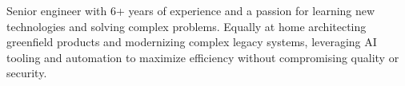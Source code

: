 

\begin{cvparagraph}

Senior engineer with 6+ years of experience and a passion for learning new technologies and solving complex problems. Equally at home architecting greenfield products and modernizing complex legacy systems, leveraging AI tooling and automation to maximize efficiency without compromising quality or security.
\end{cvparagraph}
